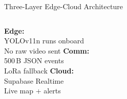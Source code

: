 \documentclass[aspectratio=169,10pt]{beamer}
\begin{document}
\begin{frame}{Three-Layer Edge-Cloud Architecture}
  \vspace{0.3em}
  \begin{columns}
      \centering\scriptsize\textcolor{edgeOrange}{\textbf{Edge:}}\\
      YOLOv11n runs onboard\\
      No raw video sent
      \centering\scriptsize\textcolor{commBlue}{\textbf{Comm:}}\\
      500\,B JSON events\\
      LoRa fallback
      \centering\scriptsize\textcolor{cloudTeal}{\textbf{Cloud:}}\\
      Supabase Realtime\\
      Live map + alerts
  \end{columns}
\end{frame}
\end{document}
